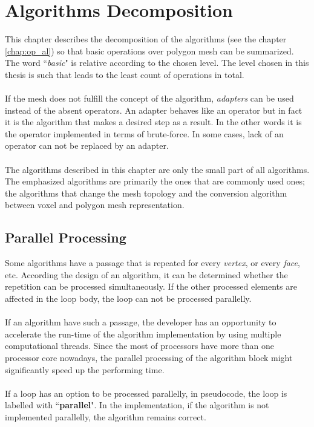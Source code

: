 \chapter{Algorithms Decomposition}
\label{chap:alg_decomp}

This chapter describes the decomposition of the algorithms (see the chapter \ref{chap:op_al}) so that basic
operations over polygon
mesh can be summarized. The word ``\emph{basic}" is relative according to the chosen level.
The level chosen in this thesis is such that leads to the least count of operations in total.\\
\\
If the mesh does not fulfill the concept of the algorithm, \emph{adapters} can be used instead
of the absent operators. An adapter behaves like an operator but in fact it is the algorithm that
makes a desired step as a result. In the other words it is the operator implemented in terms of
brute-force. In some cases, lack of an operator can not be replaced by an adapter.\\
\\
The algorithms described in this chapter are only the small part of all algorithms. The emphasized
algorithms are primarily the ones that are commonly used ones; the algorithms that change the mesh topology and
the conversion algorithm between voxel and polygon mesh representation.

\section{Parallel Processing}

Some algorithms have a passage that is repeated for every \emph{vertex}, or every \emph{face}, etc.
According the design of an algorithm, it can be determined whether the repetition can be processed
simultaneously. If the other processed elements are affected in the loop body, the loop can not
be processed parallelly.\\
\\
If an algorithm have such a passage, the developer has an opportunity to accelerate the run-time 
of the algorithm implementation by using multiple computational threads. Since the most of processors
have more than one processor core nowadays, the parallel processing of the algorithm block might
significantly speed up the performing time.\\
\\
If a loop has an option to be processed parallelly,
in pseudocode, the loop is labelled with ``\textbf{parallel}".
In the implementation, if the algorithm is not implemented parallelly, the algorithm remains correct.


